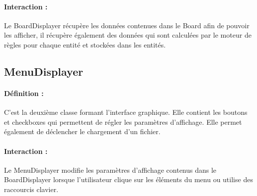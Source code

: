 			\paragraph{Interaction :}
			Le BoardDisplayer récupère les données contenues dans le Board afin de pouvoir les afficher, il récupère également des données qui sont calculées
			par le moteur de règles pour chaque entité et stockées dans les entités.

		\subsection*{MenuDisplayer}

			\paragraph{Définition :}
			C'est la deuxième classe formant l'interface graphique. Elle contient les boutons et checkboxes qui permettent
			de régler les paramètres d'affichage. Elle permet également de déclencher le chargement d'un fichier.
			\paragraph{Interaction :}
			Le MenuDisplayer modifie les paramètres d'affichage contenus dans le BoardDisplayer lorsque l'utilisateur clique
			sur les éléments du menu ou utilise des raccourcis clavier.

